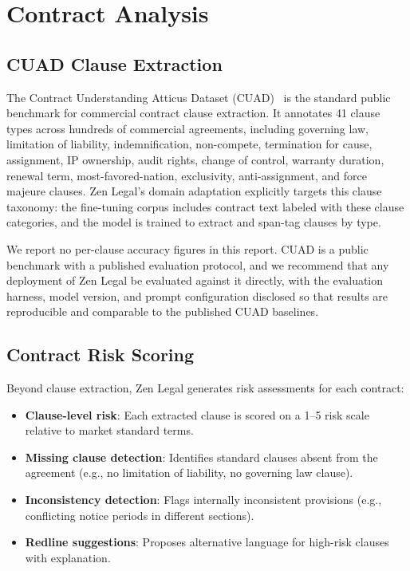 \documentclass[11pt,a4paper]{article}
\begin{document}
\section{Contract Analysis}

\subsection{CUAD Clause Extraction}

The Contract Understanding Atticus Dataset (CUAD)~\cite{cuad} is the standard public benchmark for commercial contract clause extraction. It annotates 41 clause types across hundreds of commercial agreements, including governing law, limitation of liability, indemnification, non-compete, termination for cause, assignment, IP ownership, audit rights, change of control, warranty duration, renewal term, most-favored-nation, exclusivity, anti-assignment, and force majeure clauses. Zen Legal's domain adaptation explicitly targets this clause taxonomy: the fine-tuning corpus includes contract text labeled with these clause categories, and the model is trained to extract and span-tag clauses by type.

We report no per-clause accuracy figures in this report. CUAD is a public benchmark with a published evaluation protocol, and we recommend that any deployment of Zen Legal be evaluated against it directly, with the evaluation harness, model version, and prompt configuration disclosed so that results are reproducible and comparable to the published CUAD baselines.

\subsection{Contract Risk Scoring}

Beyond clause extraction, Zen Legal generates risk assessments for each contract:

\begin{itemize}
  \item \textbf{Clause-level risk}: Each extracted clause is scored on a 1--5 risk scale relative to market standard terms.
  \item \textbf{Missing clause detection}: Identifies standard clauses absent from the agreement (e.g., no limitation of liability, no governing law clause).
  \item \textbf{Inconsistency detection}: Flags internally inconsistent provisions (e.g., conflicting notice periods in different sections).
  \item \textbf{Redline suggestions}: Proposes alternative language for high-risk clauses with explanation.
\end{itemize}
\end{document}

